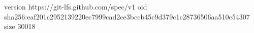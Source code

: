 version https://git-lfs.github.com/spec/v1
oid sha256:eaf201c2952139220ec7999cad2ce3bccb45c9d379c1c28736506aa510c54307
size 30018
